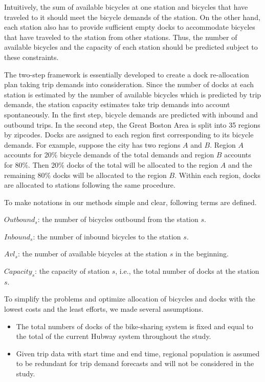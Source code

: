 \documentclass[journal, letterpaper]{IEEEtran}
\begin{document}
Intuitively, the sum of available bicycles at one station and bicycles that have traveled to it should meet the bicycle demands of the station. On the other hand, each station also has to provide sufficient empty docks to accommodate bicycles that have traveled to the station from other stations. Thus, the number of available bicycles and the capacity of each station should be predicted subject to these constraints. 

The two-step framework is essentially developed to create a dock re-allocation plan taking trip demands into consideration. Since the number of docks at each station is estimated by the number of available bicycles which is predicted by trip demands, the station capacity estimates take trip demands into account spontaneously. In the first step, bicycle demands are predicted with inbound and outbound trips. In the second step, the Great Boston Area is split into 35 regions by zipcodes. Docks are assigned to each region first corresponding to its bicycle demands. For example, suppose the city has two regions $A$ and $B$. Region $A$ accounts for 20\% bicycle demands of the total demands and region $B$ accounts for 80\%. Then 20\% docks of the total will be allocated to the region $A$ and the remaining 80\% docks will be allocated to the region $B$. Within each region, docks are allocated to stations following the same procedure.     

To make notations in our methods simple and clear, following terms are defined. 

$Outbound_{s}$: the number of bicycles outbound from the station $s$.

$Inbound_{s}$: the number of inbound bicycles to the station $s$. 

$Avl_{s}$: the number of available bicycles at the station $s$ in the beginning. 

$Capacity_{s}$: the capacity of station $s$, i.e., the total number of docks at the station $s$. 

To simplify the problems and optimize allocation of bicycles and docks with the lowest costs and the least efforts, we made several assumptions.

\begin{itemize}
\item The total numbers of docks of the bike-sharing system is fixed and equal to the total of the current Hubway system throughout the study.
\item Given trip data with start time and end time, regional population is assumed to be redundant for trip demand forecasts and will not be considered in the study.
\end{itemize} 
\end{document}
